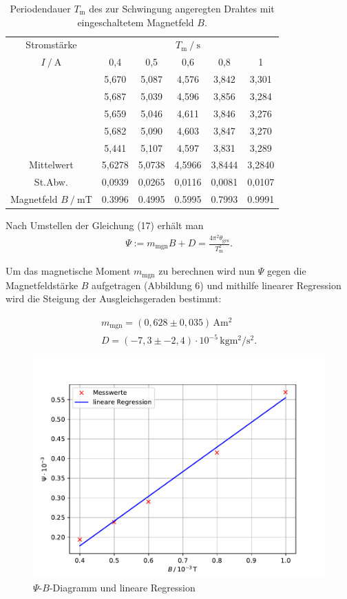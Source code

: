 \begin{table}
\centering
\caption{Periodendauer $T_\text{m}$ des zur Schwingung angeregten Drahtes mit eingeschaltetem Magnetfeld $B$.}
\label{tab:periodendauer}
\begin{tabular}{c c c c c c}
\toprule
\multicolumn{1}{c}{Stromstärke} & & & $T_\text{m}\:/\:\si{\second}$ & & \\
{$I\:/\:\si{\ampere}$} & {0,4} & {0,5} & {0,6} & {0,8} & {1} \\
\midrule
 & 5,670 & 5,087 & 4,576 & 3,842 & 3,301\\
 & 5,687 & 5,039 & 4,596 & 3,856 & 3,284\\
 & 5,659 & 5,046 & 4,611 & 3,846 & 3,276\\
 & 5,682 & 5,090 & 4,603 & 3,847 & 3,270\\
 & 5,441 & 5,107 & 4,597 & 3,831 & 3,289\\
\hline
Mittelwert & 5,6278 & 5,0738 & 4,5966 & 3,8444 & 3,2840 \\
St.Abw. & 0,0939 & 0,0265 & 0,0116 & 0,0081 & 0,0107 \\
\hline
Magnetfeld $B\:/\:\si{\milli\tesla}$ & 0.3996 & 0.4995 & 0.5995 & 0.7993 & 0.9991\\
\bottomrule
\end{tabular}
\end{table}

\noindent Nach Umstellen der Gleichung (17) erhält man
\begin{align}
\Psi := m_\text{mgn}B + D = \frac{4\pi^2\theta_\text{ges}}{T_\text{m}^2}.
\end{align}

\noindent Um das magnetische Moment $m_\text{mgn}$ zu berechnen wird nun $\Psi$ gegen
die Magnetfeldstärke $B$ aufgetragen (Abbildung 6) und mithilfe linearer Regression 
wird die Steigung der Ausgleichsgeraden bestimmt:

\begin{align*}
m_\text{mgn} = (0,628 \pm 0,035)\,\si{\ampere\meter\squared}\\
D = (-7,3 \pm -2,4) \cdot 10^{-5}\,\si{\kilo\gram\meter\squared\per\second\squared}.
\end{align*}

\begin{figure}[H]
 \centering
  \includegraphics{linreg.pdf}
  \caption{$\Psi$-$B$-Diagramm und lineare Regression}
  \label{fig:drill}
\end{figure}